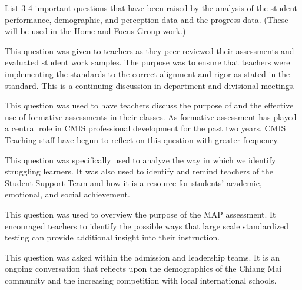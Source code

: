 List 3-4 important questions that have been raised by the analysis of the student performance, demographic, and perception data and the progress data.  (These will be used in the Home and Focus Group work.)


This question was given to teachers as they peer reviewed their assessments and evaluated student work samples. The purpose was to ensure that teachers were implementing the standards to the correct alignment and rigor as stated in the standard. This is a continuing discussion in department and divisional meetings.


This question was used to have teachers discuss the purpose of and the effective use of formative assessments in their classes. As formative assessment has played a central role in CMIS professional development for the past two years, CMIS Teaching staff have begun to reflect on this question with greater frequency. 


This question was specifically used to analyze the way in which we identify struggling learners. It was also used to identify and remind teachers of the Student Support Team and how it is a resource for students’ academic, emotional, and social achievement.


This question was used to overview the purpose of the MAP assessment. It encouraged teachers to identify the possible ways that large scale standardized testing can provide additional insight into their instruction. 


This question was asked within the admission and leadership teams. It is an ongoing conversation that reflects upon the demographics of the Chiang Mai community and the increasing competition with local international schools. 

